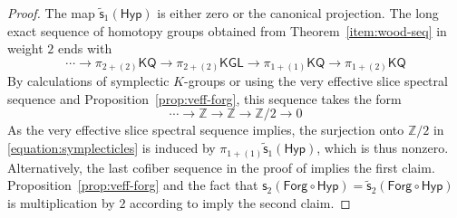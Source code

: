 \documentclass[11pt,hyp,english]{article}
\newcommand{\Z}{\mathbb{Z}}
\newcommand{\KGL}{\mathsf{KGL}}
\newcommand{\KQ}{\mathsf{KQ}}
\newcommand{\MZ}{\mathsf{M}\Z}
\newcommand{\s}{\mathsf{s}}
\newcommand{\vs}{\tilde{\mathsf{s}}}
\newcommand{\Forg}{\mathsf{Forg}}
\newcommand{\Hyper}{\mathsf{Hyp}}
\theoremstyle{definition}
\begin{document}
\begin{proof}
The map $\vs_1(\Hyper)$ is either zero or the canonical projection. 
The long exact sequence of homotopy groups obtained from Theorem~\ref{item:wood-seq} in weight $2$ ends with 
\[ 
\dotsm \rightarrow
\pi_{2+(2)}\KQ 
\rightarrow
\pi_{2+(2)} \KGL 
\rightarrow
\pi_{1+(1)} \KQ 
\rightarrow
\pi_{1+(2)}\KQ 
\]
By calculations of symplectic $K$-groups or using the very effective slice spectral sequence 
and Proposition~\ref{prop:veff-forg}, 
this sequence takes the form 
\begin{equation}
\label{equation:symplecticles}
\dotsm 
\rightarrow
\Z 
\rightarrow
\Z 
\rightarrow
\Z/2 
\rightarrow
0
\end{equation}
As the very effective slice spectral sequence implies,
the surjection onto $\Z/2$ in \eqref{equation:symplecticles} 
is induced by $\pi_{1+(1)}\vs_1(\Hyper)$, 
which is thus nonzero.
Alternatively, the last cofiber sequence in the proof of  implies the first claim.
Proposition~\ref{prop:veff-forg} and
the fact that $\s_2(\Forg \circ \Hyper)=\vs_2(\Forg \circ \Hyper)$
is multiplication by $2$ according to \cite[Proposition 4.4]{RO:slices} imply the second claim.
\end{proof}
\end{document}

